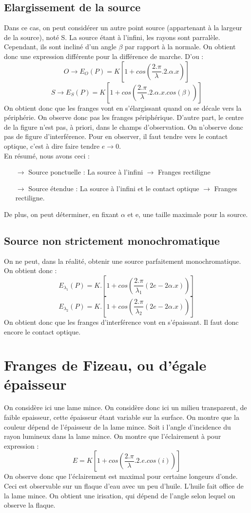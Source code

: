 \subsection{Elargissement de la source}
Dans ce cas, on peut considérer un autre point source (appartenant à la largeur de la source), noté S. La source étant à l'infini, les rayons sont parralèle. Cependant, ils sont incliné d'un angle $\beta$ par rapport à la normale. On obtient donc une expression différente pour la différence de marche. D'ou : 
$$O \rightarrow E_O(P) = K[1 + cos(\dfrac{2.\pi}{\lambda}.2.\alpha.x)]$$
$$S \rightarrow E_S(P) = K[1 + cos(\dfrac{2.\pi}{\lambda}.2.\alpha.x.cos(\beta))]$$
On obtient donc que les franges vont en s'élargissant quand on se décale vers la périphérie. On observe donc pas les franges périphérique. D'autre part, le centre de la figure n'est pas, à priori, dans le champs d'observation. On n'observe donc pas de figure d'interférence. Pour en observer, il faut tendre vers le contact optique, c'est à dire faire tendre $e \rightarrow 0$.\\
En résumé, nous avons ceci : 
\begin{itemize}
 \item[$\rightarrow$] Source ponctuelle : La source à l'infini $\rightarrow$ Franges rectiligne
 \item[$\rightarrow$] Source étendue : La source à l'infini et le contact optique $\rightarrow$ Franges rectiligne.
\end{itemize}
De plus, on peut déterminer, en fixant $\alpha$ et e, une taille maximale pour la source.
\subsection{Source non strictement monochromatique}
On ne peut, dans la réalité, obtenir une source parfaitement monochromatique. On obtient donc : 
$$E_{\lambda_1}(P) = K.[1 + cos(\dfrac{2.\pi}{\lambda_1}(2e - 2\alpha.x))]$$
$$E_{\lambda_2}(P) = K.[1 + cos(\dfrac{2.\pi}{\lambda_2}(2e - 2\alpha.x))]$$
On obtient donc que les franges d'interférence vont en s'épaissant. Il faut donc encore le contact optique.
\section{Franges de Fizeau, ou d'égale épaisseur}
On considère ici une lame mince. On considère donc ici un milieu transparent, de faible epaisseur, cette épaisseur étant variable sur la surface. On montre que la couleur dépend de l'épaisseur de la lame mince. Soit i l'angle d'incidence du rayon lumineux dans la lame mince. On montre que l'éclairement à pour expression : 
$$E = K[1 + cos(\dfrac{2.\pi}{\lambda}.2.e.cos(i))]$$
On observe donc que l'éclairement est maximal pour certaine longeurs d'onde. Ceci est observable sur un flaque d'eau avec un peu d'huile. L'huile fait office de la lame mince. On obtient une irisation, qui dépend de l'angle selon lequel on observe la flaque.
